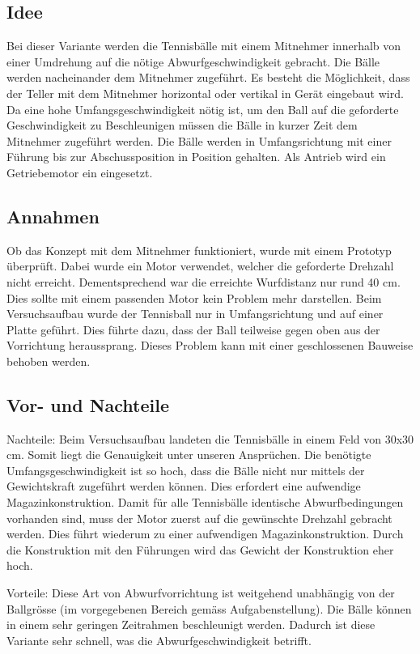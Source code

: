 \subsection{Idee}
Bei dieser Variante werden die Tennisbälle mit einem Mitnehmer innerhalb von einer Umdrehung auf die nötige Abwurfgeschwindigkeit gebracht. Die Bälle werden nacheinander dem Mitnehmer zugeführt. Es besteht die Möglichkeit, dass der Teller mit dem Mitnehmer horizontal oder vertikal in Gerät eingebaut wird. Da eine hohe Umfangsgeschwindigkeit nötig ist, um den Ball auf die geforderte Geschwindigkeit zu Beschleunigen müssen die Bälle in kurzer Zeit dem Mitnehmer zugeführt werden. Die Bälle werden in Umfangsrichtung mit einer Führung bis zur Abschussposition in Position gehalten. Als Antrieb wird ein Getriebemotor ein eingesetzt.  

\subsection{Annahmen}
Ob das Konzept mit dem Mitnehmer funktioniert, wurde mit einem Prototyp überprüft. Dabei wurde ein Motor verwendet, welcher die geforderte Drehzahl nicht erreicht. Dementsprechend war die erreichte Wurfdistanz nur rund 40 cm. Dies sollte mit einem passenden Motor kein Problem mehr darstellen. Beim Versuchsaufbau wurde der Tennisball nur in Umfangsrichtung und auf einer Platte geführt. Dies führte dazu, dass der Ball teilweise gegen oben aus der Vorrichtung heraussprang. Dieses Problem kann mit einer geschlossenen Bauweise behoben werden.   

\subsection{Vor- und Nachteile}
Nachteile: Beim Versuchsaufbau landeten die Tennisbälle in einem Feld von 30x30 cm. Somit liegt die Genauigkeit unter unseren Ansprüchen. Die benötigte Umfangsgeschwindigkeit ist so hoch, dass die Bälle nicht nur mittels der Gewichtskraft zugeführt werden können. Dies erfordert eine aufwendige Magazinkonstruktion. Damit für alle Tennisbälle identische Abwurfbedingungen vorhanden sind, muss der Motor zuerst auf die gewünschte Drehzahl gebracht werden. Dies führt wiederum zu einer aufwendigen Magazinkonstruktion. Durch die Konstruktion mit den Führungen wird das Gewicht der Konstruktion eher hoch.  

Vorteile: Diese Art von Abwurfvorrichtung ist weitgehend unabhängig von der Ballgrösse (im vorgegebenen Bereich gemäss Aufgabenstellung). Die Bälle können in einem sehr geringen Zeitrahmen beschleunigt werden. Dadurch ist diese Variante sehr schnell, was die Abwurfgeschwindigkeit betrifft.   

